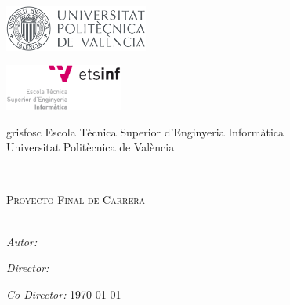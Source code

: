 
\begin{titlepage}
\begin{center}

\begin{minipage}{0.49\linewidth}
\begin{flushleft}
\includegraphics[height=1.5cm]{./imgs/logos/logo-upv}
\end{flushleft}
\end{minipage}
\begin{minipage}{0.49\linewidth}
\begin{flushright}
\includegraphics[height=1.5cm]{./imgs/logos/logo-etsinf}
\end{flushright}
\end{minipage}

\vspace{2cm}

\begin{color}{grisfosc}
\large
Escola Tècnica Superior d'Enginyeria Informàtica\\[0.2cm]
Universitat Politècnica de València\\[1.9cm]
\end{color}

\begin{spacing}{1.7}
{\Large \bfseries \titulo}\\[1.5cm]
\end{spacing}
\textsc{\large Proyecto Final de Carrera}\\[0.4cm]
\textcolor{grisclar}{\large\titulacion}\\[5.0cm]

\begin{flushright} \large
\emph{Autor:} \autor\par
\emph{Director:} \director\par
\emph{Co Director:} \codirector
\today
\end{flushright}


\end{center}

\end{titlepage}
